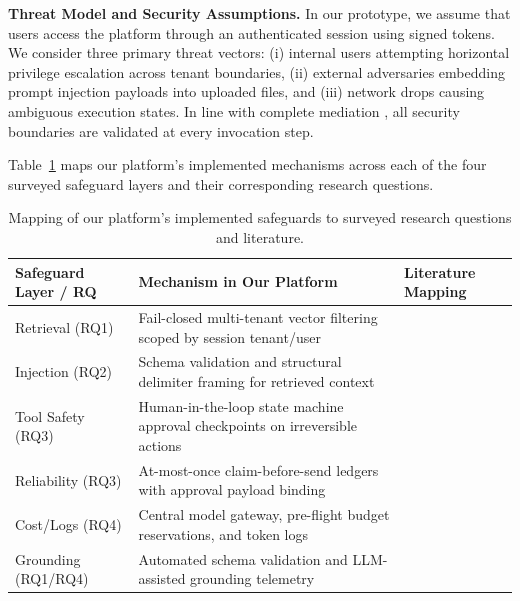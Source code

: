 \documentclass[sigconf]{acmart}
\begin{document}
\textbf{Threat Model and Security Assumptions.} In our prototype, we assume that users access the platform through an authenticated session using signed tokens. We consider three primary threat vectors: (i) internal users attempting horizontal privilege escalation across tenant boundaries, (ii) external adversaries embedding prompt injection payloads into uploaded files, and (iii) network drops causing ambiguous execution states. In line with complete mediation \cite{saltzer1975protection}, all security boundaries are validated at every invocation step.

Table~\ref{tab:implementation} maps our platform's implemented mechanisms across each of the four surveyed safeguard layers and their corresponding research questions.

\begin{table}[!htbp]
\centering
\caption{Mapping of our platform's implemented safeguards to surveyed research questions and literature.}
\label{tab:implementation}
\footnotesize
\setlength{\tabcolsep}{2.5pt}
\begin{tabular}{p{1.9cm}p{4.1cm}p{1.6cm}}
\toprule
\textbf{Safeguard Layer / RQ} & \textbf{Mechanism in Our Platform} & \textbf{Literature Mapping} \\
\midrule
Retrieval (RQ1) & Fail-closed multi-tenant vector filtering scoped by session tenant/user & \cite{jeonglee2025permissionawarerag,zou2024poisonedrag} \\
Injection (RQ2) & Schema validation and structural delimiter framing for retrieved context & \cite{greshake2023indirect,wallace2024hierarchy} \\
Tool Safety (RQ3) & Human-in-the-loop state machine approval checkpoints on irreversible actions & \cite{doshi2026verifiablysafetooluse,owasp2025llm} \\
Reliability (RQ3) & At-most-once claim-before-send ledgers with approval payload binding & \cite{mansoor2026verifiedtoolcalls} \\
Cost/Logs (RQ4) & Central model gateway, pre-flight budget reservations, and token logs & \cite{dev2025threat,kulkarni2025grails} \\
Grounding (RQ1/RQ4) & Automated schema validation and LLM-assisted grounding telemetry & \cite{es2024ragas} \\
\bottomrule
\end{tabular}
\end{table}
\end{document}
